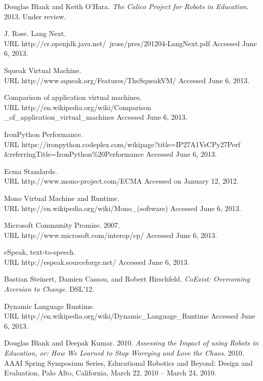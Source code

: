 \documentclass[preprint]{sigplanconf}
\begin{document}
\begin{thebibliography}{}
 Douglas Blank and Keith
  O'Hara. \textit{The Calico Project for Robots in
    Education}. 2013. Under review.

J. Rose. Lang Next.\\ URL
http://cr.openjdk.java.net/~jrose/pres/201204-LangNext.pdf Accessed
June 6, 2013.

Squeak Virtual Machine.\\ URL http://www.squeak.org/Features/TheSqueakVM/ Accessed June 6, 2013.

 Comparison of application virtual machines.\\ URL
  http://en.wikipedia.org/wiki/Comparison \_of\_application\_virtual\_machines
  Accessed June 6, 2013.

 IronPython Performance. \\ URL
  https://ironpython.codeplex.com/wikipage?title=IP27A1VsCPy27Perf
  \&referringTitle=IronPython\%20Performance Accessed June 6, 2013.

 Ecma Standards.\\
URL http://www.mono-project.com/ECMA Accessed on January 12, 2012.

 Mono Virtual Machine and Runtime.\\ URL http://en.wikipedia.org/wiki/Mono\_(software) Accessed June 6, 2013.

 Microsoft Community Promise. 2007.\\
URL http://www.microsoft.com/interop/cp/ Accessed June 6, 2013.

 eSpeak, text-to-speech.\\ URL http://espeak.sourceforge.net/ Accessed June 6, 2013.

 Bastian Steinert, Damien Cassou, and
  Robert Hirschfeld. \textit{CoExist: Overcoming Aversion to
    Change}. DSL'12.

 Dynamic Language Runtime.\\ URL
  http://en.wikipedia.org/wiki/Dynamic\_Language\_Runtime Accessed
  June 6, 2013.

 Douglas Blank and Deepak
  Kumar. 2010. \textit{Assessing the Impact of using Robots in
    Education, or: How We Learned to Stop Worrying and Love the
    Chaos}. 2010. AAAI Spring Symposium Series, Educational Robotics
  and Beyond: Design and Evaluation, Palo Alto, California, March 22,
  2010 – March 24, 2010.


\end{thebibliography}
\end{document}
